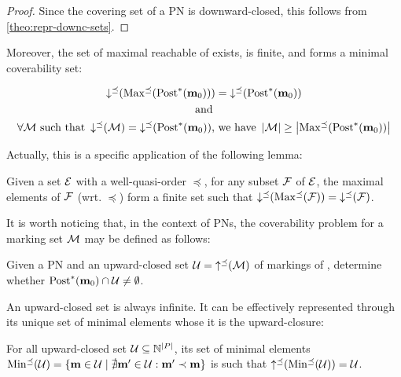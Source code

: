 \begin{proof}
  Since the covering set of a PN is downward-closed, this follows from \cref{theo:repr-downc-sets}.
\end{proof}

Moreover, the set of maximal reachable \omarks of \namePN exists, is finite, and forms a minimal coverability set:


\begin{gather*}
\operatorname{\downarrow^\preceq}(\operatorname{Max^\preceq}(\operatorname{Post}^*_{{}}(\mathbf{m}_0))) = \operatorname{\downarrow^\preceq}(\operatorname{Post}^*_{{}}(\mathbf{m}_0)) \\*
\text{ and } \\*
\forall \mathcal{M} \text{ such that } \operatorname{\downarrow^\preceq}(\mathcal{M}) = \operatorname{\downarrow^\preceq}(\operatorname{Post}^*_{{}}(\mathbf{m}_0))\text{, we have } \left|\mathcal{M}\right| \geq \left|\operatorname{Max^\preceq}(\operatorname{Post}^*_{{}}(\mathbf{m}_0))\right|
\end{gather*}

Actually, this is a specific application of the following lemma:

\begin{lemm}
  \label{theo:finite-max-set}
  Given a set $\mathcal{E}$ with a well-quasi-order $\preceq$,
  for any subset $\mathcal{F}$ of $\mathcal{E}$,
  the maximal elements of $\mathcal{F}$ (wrt. $\preceq$) form a finite set such that $\operatorname{\downarrow^\preceq}(\operatorname{Max^\preceq}(\mathcal{F})) = \operatorname{\downarrow^\preceq}(\mathcal{F})$.
\end{lemm}


It is worth noticing that, in the context of \acp{PN}, the coverability problem for a marking set  $\mathcal{M}$ may be defined as follows:
\begin{defi}
  \label{defi:upclocovprblm}
  Given a \ac{PN} \namePN and an upward-closed set $\mathcal{U} = \operatorname{\uparrow^\preceq}(\mathcal{M})$ of markings of \namePN, determine whether $\operatorname{Post}^*_{{}}(\mathbf{m}_0) \cap \mathcal{U} \neq \emptyset$.
\end{defi}

\label{text:upward-closed-set-representation}
An upward-closed set is always infinite.
It can be effectively represented through its unique set of minimal elements whose it is the upward-closure:
\begin{lemm}
  \label{theo:upward-closed-set-representation}
  For all upward-closed set $\mathcal{U} \subseteq \mathbb{N}^{\left|P\right|}$, its set of minimal elements $\operatorname{Min^\preceq}(\mathcal{U}) = \{\mathbf{m} \in \mathcal{U} \mid \nexists \mathbf{m}' \in \mathcal{U} : \mathbf{m}' \prec \mathbf{m}\}$ is such that $\operatorname{\uparrow^\preceq}(\operatorname{Min^\preceq}(\mathcal{U})) = \mathcal{U}$.
\end{lemm}

